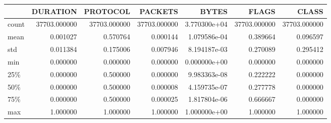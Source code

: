 \begin{tabular}{lrrrrrr}
\toprule
{} &      DURATION &      PROTOCOL &       PACKETS &         BYTES &         FLAGS &         CLASS \\
\midrule
count &  37703.000000 &  37703.000000 &  37703.000000 &  3.770300e+04 &  37703.000000 &  37703.000000 \\
mean  &      0.001027 &      0.570764 &      0.000144 &  1.079586e-04 &      0.389664 &      0.096597 \\
std   &      0.011384 &      0.175006 &      0.007946 &  8.194187e-03 &      0.270089 &      0.295412 \\
min   &      0.000000 &      0.000000 &      0.000000 &  0.000000e+00 &      0.000000 &      0.000000 \\
25\%   &      0.000000 &      0.500000 &      0.000000 &  9.983363e-08 &      0.222222 &      0.000000 \\
50\%   &      0.000000 &      0.500000 &      0.000008 &  4.159735e-07 &      0.277778 &      0.000000 \\
75\%   &      0.000000 &      0.500000 &      0.000025 &  1.817804e-06 &      0.666667 &      0.000000 \\
max   &      1.000000 &      1.000000 &      1.000000 &  1.000000e+00 &      1.000000 &      1.000000 \\
\bottomrule
\end{tabular}
